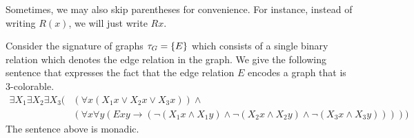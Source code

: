 \documentclass[11pt,twoside=off,numbers=noenddot]{scrbook}
\begin{document}
\begin{abuse}
  Sometimes, we may also skip parentheses for convenience. For instance, instead of writing $R(x)$, we will just write $R x$.
\end{abuse}

\begin{example}
  Consider the signature of graphs $\tau_G = \{ E \}$ which consists of a single binary relation which denotes the edge relation in the graph. We give the following sentence that expresses the fact that the edge relation $E$ encodes a graph that is 3-colorable.
  \begin{align*}
    \exists X_1 \exists X_2 \exists X_3 ( & (\forall x (X_1 x \vee X_2 x \vee X_3 x)) \wedge \\
    & (\forall x \forall y (E x y \rightarrow (\neg (X_1 x \wedge X_1 y) \wedge \neg (X_2 x \wedge X_2 y) \wedge \neg (X_3 x \wedge X_3 y)))))
  \end{align*}
  The sentence above is monadic.
\end{example}
\end{document}
